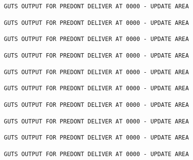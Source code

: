 \texttt{GUTS OUTPUT FOR PREDONT DELIVER AT 0000 - UPDATE AREA}

\texttt{GUTS OUTPUT FOR PREDONT DELIVER AT 0000 - UPDATE AREA}

\texttt{GUTS OUTPUT FOR PREDONT DELIVER AT 0000 - UPDATE AREA}

\texttt{GUTS OUTPUT FOR PREDONT DELIVER AT 0000 - UPDATE AREA}

\texttt{GUTS OUTPUT FOR PREDONT DELIVER AT 0000 - UPDATE AREA}

\texttt{GUTS OUTPUT FOR PREDONT DELIVER AT 0000 - UPDATE AREA}

\texttt{GUTS OUTPUT FOR PREDONT DELIVER AT 0000 - UPDATE AREA}

\texttt{GUTS OUTPUT FOR PREDONT DELIVER AT 0000 - UPDATE AREA}

\texttt{GUTS OUTPUT FOR PREDONT DELIVER AT 0000 - UPDATE AREA}

\texttt{GUTS OUTPUT FOR PREDONT DELIVER AT 0000 - UPDATE AREA}
